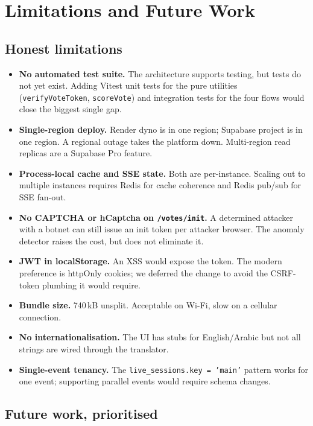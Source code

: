 \section{Limitations and Future Work}
\label{sec:future}

\subsection{Honest limitations}

\begin{itemize}[leftmargin=*]
  \item \textbf{No automated test suite.} The architecture supports
        testing, but tests do not yet exist. Adding Vitest unit tests for
        the pure utilities (\texttt{verifyVoteToken},
        \texttt{scoreVote}) and integration tests for the four flows
        would close the biggest single gap.
  \item \textbf{Single-region deploy.} Render dyno is in one region;
        Supabase project is in one region. A regional outage takes the
        platform down. Multi-region read replicas are a Supabase Pro
        feature.
  \item \textbf{Process-local cache and SSE state.} Both are
        per-instance. Scaling out to multiple instances requires Redis
        for cache coherence and Redis pub/sub for SSE fan-out.
  \item \textbf{No CAPTCHA or hCaptcha on \texttt{/votes/init}.}
        A determined attacker with a botnet can still issue an init token
        per attacker browser. The anomaly detector raises the cost, but
        does not eliminate it.
  \item \textbf{JWT in localStorage.} An XSS would expose the token. The
        modern preference is httpOnly cookies; we deferred the change to
        avoid the CSRF-token plumbing it would require.
  \item \textbf{Bundle size.} 740\,kB unsplit. Acceptable on Wi-Fi,
        slow on a cellular connection.
  \item \textbf{No internationalisation.} The UI has stubs for
        English/Arabic but not all strings are wired through the
        translator.
  \item \textbf{Single-event tenancy.} The \texttt{live\_sessions.key
        = 'main'} pattern works for one event; supporting parallel
        events would require schema changes.
\end{itemize}

\subsection{Future work, prioritised}

